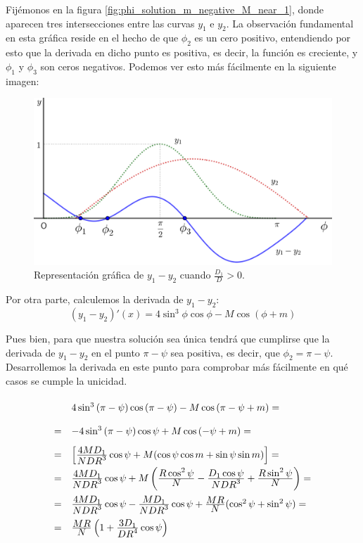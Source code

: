 \documentclass[11pt]{article}
\newcommand\ddfrac[2]{\frac{\displaystyle #1}{\displaystyle #2}}
\begin{document}
Fijémonos en la figura \ref{fig:phi_solution_m_negative_M_near_1}, donde aparecen tres intersecciones entre las curvas $y_1$ e $y_2$. La observación fundamental en esta gráfica reside en el hecho de que $\phi_2$ es un cero positivo, entendiendo por esto que la derivada en dicho punto es positiva, es decir, la función es creciente, y $\phi_1$ y $\phi_3$ son ceros negativos. Podemos ver esto más fácilmente en la siguiente imagen:

\begin{figure}[H]
\centering
\includegraphics[scale=0.125]{images/y_1_menos_y_2.png}
\caption{Representación gráfica de $y_1-y_2$ cuando $\ddfrac{D_1}{D}>0$.}
\label{fig:y_1_menos_y_2}
\end{figure}

Por otra parte, calculemos la derivada de $y_1-y_2$:
\[
(y_1-y_2)'(x)=4\sin^3{\phi}\cos{\phi}-M\cos{(\phi+m)}
\]

Pues bien, para que nuestra solución sea única tendrá que cumplirse que la derivada de $y_1-y_2$ en el punto $\pi-\psi$ sea positiva, es decir, que $\phi_2=\pi-\psi$. Desarrollemos la derivada en este punto para comprobar más fácilmente en qué casos se cumple la unicidad.
\[
\def\arraystretch{2}
\begin{array}{ll}
  & 4\sin^3{(\pi-\psi)}\cos{(\pi-\psi)}-M\cos{(\pi-\psi+m)}=\\
= &-4\sin^3{(\pi-\psi)}\cos{\psi}+M\cos{(-\psi+m)}=\\
= & \left[\ddfrac{4MD_1}{NDR^3}\cos{\psi}+M(\cos{\psi}\cos{m}+\sin{\psi}\sin{m})\right]=\\
= & \ddfrac{4MD_1}{NDR^3}\cos{\psi}+M\left(\ddfrac{R\cos^2{\psi}}{N}-\ddfrac{D_1\cos{\psi}}{NDR^3}+\ddfrac{R\sin^2{\psi}}{N}\right)=\\
= & \ddfrac{4MD_1}{NDR^3}\cos{\psi}-\ddfrac{MD_1}{NDR^3}\cos{\psi}+\ddfrac{MR}{N}(\cos^2{\psi}+\sin^2{\psi})=\\
= & \ddfrac{MR}{N}\left(1+\ddfrac{3D_1}{DR^4}\cos{\psi}\right)
\end{array}
\]
\end{document}
